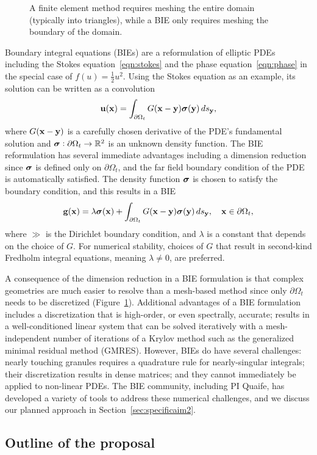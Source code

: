 \begin{figure}
  \caption{\label{fig:fem_vs_bie} \footnotesize A finite element method
  requires meshing the entire domain (typically into triangles), while a
  BIE only requires meshing the boundary of the domain.}
\end{figure}
Boundary integral equations (BIEs) are a reformulation of elliptic PDEs
including the Stokes equation~\eqref{eqn:stokes} and the phase
equation~\eqref{eqn:phase} in the special case of $f(u) =
\tfrac{1}{2}u^2$. Using the Stokes equation as an example, its solution
can be written as a convolution 
\begin{align*}
  \mathbf{u}(\mathbf{x}) = \int_{\partial\Omega_t} G(\mathbf{x} - \mathbf{y}) \boldsymbol{\sigma}(\mathbf{y}) \, ds_{\mathbf{y}},
\end{align*}
where $G(\mathbf{x} - \mathbf{y})$ is a carefully chosen derivative of the PDE's
fundamental solution and $\boldsymbol{\sigma}: \partial \Omega_t \rightarrow \mathbb{R}^2$
is an unknown density function. The BIE reformulation has several
immediate advantages including a dimension reduction since $\boldsymbol{\sigma}$ is
defined only on $\partial \Omega_t$, and the far field boundary
condition of the PDE is automatically satisfied. The density
function $\boldsymbol{\sigma}$ is chosen to satisfy the boundary condition, and this
results in a BIE 
\begin{align*}
  \mathbf{g}(\mathbf{x}) = \lambda \boldsymbol{\sigma}(\mathbf{x}) + 
    \int_{\partial\Omega_t} G(\mathbf{x} - \mathbf{y}) \boldsymbol{\sigma}(\mathbf{y}) \, ds_{\mathbf{y}},
    \quad \mathbf{x} \in \partial\Omega_t,
\end{align*}
where $\gg$ is the Dirichlet boundary condition, and $\lambda$ is a
constant that depends on the choice of $G$. For numerical stability,
choices of $G$ that result in second-kind Fredholm integral equations,
meaning $\lambda \neq 0$, are preferred.

A consequence of the dimension reduction in a BIE formulation is that
complex geometries are much easier to resolve than a mesh-based method
since only $\partial \Omega_t$ needs to be discretized
(Figure~\ref{fig:fem_vs_bie}). Additional advantages of a BIE
formulation includes a discretization that is high-order, or even
spectrally, accurate; results in a well-conditioned linear system that
can be solved iteratively with a mesh-independent number of iterations
of a Krylov method such as the generalized minimal residual method
(GMRES). However, BIEs do have several challenges: nearly touching
granules requires a quadrature rule for nearly-singular integrals; their
discretization results in dense matrices; and they cannot immediately be
applied to non-linear PDEs. The BIE community, including PI Quaife, has
developed a variety of tools to address these numerical challenges, and
we discuss our planned approach in Section~\ref{sec:specificaim2}.




\subsection{Outline of the proposal}

